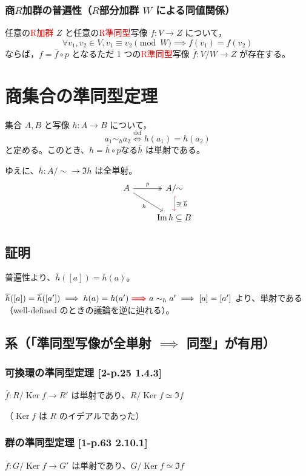 \documentclass[twocolumn]{jsarticle}
\newcommand{\iffdef}{\stackrel{\text{def}}{\iff}}
\DeclareMathOperator{\Ker}{Ker}
\begin{document}
\subsubsection{商\(R\)加群の普遍性（\(R\)部分加群 \(W\) による同値関係）}
任意の\textcolor{red}{R加群} \(Z\) と任意の\textcolor{red}{R準同型}写像 \(f \colon V \to Z\) について，
\[\forall v_1, v_2 \in V, v_1 \equiv v_2\pmod W \implies f(v_1) = f(v_2)\]
ならば，\(f = \overline{f} \circ p\) となるただ 1 つの\textcolor{red}{R準同型}写像 \(\overline{f} \colon V/W \to Z\) が存在する。
\newpage

\section{商集合の準同型定理}
\begin{screen}
集合 \(A, B\) と写像 \(h \colon A \to B\) について，
\[a_1 \sim_h a_2 \iffdef h(a_1) = h(a_2)\]
と定める。このとき、\(h=\overline{h}\circ p\)なる\(\overline{h}\) は単射である。

ゆえに、\(\overline{h}\colon A/{\sim} \to \Im h\) は全単射。
\[
\begin{tikzcd}
  A \ar[r, "p", two heads] \ar[rd, "h"'] & A/{\sim} \ar[d, red, "\textcolor{black}{\exists! \: \overline{h}}", hook] \\
  & \Im h \subseteq B
\end{tikzcd}
\]
\end{screen}

\subsection{証明}
普遍性より、\(\overline{h}([a]) = h(a)\)。

\(\overline{h}([a]) = \overline{h}([a']) \implies h(a) = h(a') \textcolor{red}{\bm{\implies}} a\sim_h a' \implies [a] = [a']\) より、単射である（well-defined のときの議論を逆に辿れる）。

\subsection{系（「準同型写像が全単射 \(\implies\) 同型」が有用）}
\subsubsection{可換環の準同型定理 [2-p.25 1.4.3]}
\(\overline{f} \colon R/\Ker f \to R'\) は単射であり、\(R/\Ker f \simeq \Im f\)

（\(\Ker f\) は \(R\) のイデアルであった）
\subsubsection{群の準同型定理 [1-p.63 2.10.1]}
\(\overline{f} \colon G/\Ker f \to G'\) は単射であり、\(G/\Ker f \simeq \Im f\)
\end{document}
